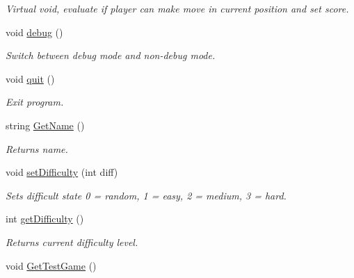 \begin{DoxyCompactItemize}
\begin{DoxyCompactList}\small\item\em Virtual void, evaluate if player can make move in current position and set score. \end{DoxyCompactList}\item 
\hypertarget{class_game_a29997a321e10a5456f0aef9e95c51757}{void \hyperlink{class_game_a29997a321e10a5456f0aef9e95c51757}{debug} ()}\label{class_game_a29997a321e10a5456f0aef9e95c51757}

\begin{DoxyCompactList}\small\item\em Switch between debug mode and non-\/debug mode. \end{DoxyCompactList}\item 
\hypertarget{class_game_a8272be134d16c277bb014ad6a22fc357}{void \hyperlink{class_game_a8272be134d16c277bb014ad6a22fc357}{quit} ()}\label{class_game_a8272be134d16c277bb014ad6a22fc357}

\begin{DoxyCompactList}\small\item\em Exit program. \end{DoxyCompactList}\item 
\hypertarget{class_game_ab81299d944d2779d482067640e576389}{string \hyperlink{class_game_ab81299d944d2779d482067640e576389}{Get\-Name} ()}\label{class_game_ab81299d944d2779d482067640e576389}

\begin{DoxyCompactList}\small\item\em Returns name. \end{DoxyCompactList}\item 
\hypertarget{class_game_ae8ac0005c039f0f5f2dd1c10a299fe8d}{void \hyperlink{class_game_ae8ac0005c039f0f5f2dd1c10a299fe8d}{set\-Difficulty} (int diff)}\label{class_game_ae8ac0005c039f0f5f2dd1c10a299fe8d}

\begin{DoxyCompactList}\small\item\em Sets difficult state 0 = random, 1 = easy, 2 = medium, 3 = hard. \end{DoxyCompactList}\item 
\hypertarget{class_game_a2c0efe888e453a7fc0e644503fbd6316}{int \hyperlink{class_game_a2c0efe888e453a7fc0e644503fbd6316}{get\-Difficulty} ()}\label{class_game_a2c0efe888e453a7fc0e644503fbd6316}

\begin{DoxyCompactList}\small\item\em Returns current difficulty level. \end{DoxyCompactList}\item 
\hypertarget{class_game_a1f47238d93728540edb7940a80a9db89}{void \hyperlink{class_game_a1f47238d93728540edb7940a80a9db89}{Get\-Test\-Game} ()}\label{class_game_a1f47238d93728540edb7940a80a9db89}


\end{DoxyCompactItemize}

